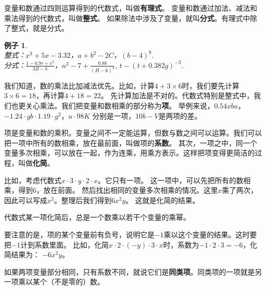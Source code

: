 \documentclass[12pt,UTF8]{ctexbook}
\newtheorem{ex}{例子}[section]
\begin{document}
变量和数通过四则运算得到的代数式，叫做\textbf{有理式}。
变量和数通过加法、减法和乘法得到的代数式，叫做\textbf{整式}。
如果除法中涉及了变量，就叫\textbf{分式}。有理式中除了整式，就是分式。
\begin{ex}\label{ex:1-1-0}
    \mbox{} \\
    \indent 整式：$x^3 + 5x - 3.32$，$a + b^2 - 2C$，$(b - 4)^9.$ \\
    \indent 分式：$\frac{1 - 0.9r + v^2}{3B - k}$，$n^2 - 7 + \frac{0.88}{(H - 6)^3}$, $t - (t + 0.382g)^{-3}.$\\
\end{ex}

我们知道，数的乘法比加减法优先。比如，计算$4 + 3\times 6$时，我们要先计算$3\times 6 = 18$，再计算$4 + 18 = 22$。
先计算加法是不对的。代数式特别是整式中，我们也更关心乘法。我们把变量和数相乘的部分称为\textbf{项}。
举例来说，$0.54xba$，$-1.24\cdot gb\cdot 1.19 \cdot g^2$，$u\cdot 98K$
分别是一项，$10b - V$是两项的差。

项是变量和数的乘积。变量之间不一定能运算，但数与数之间可以运算。我们可以把一项中所有的数相乘，放在最前面，叫做项的\textbf{系数}。
其次，一项之中，同一个变量多次相乘，可以放在一起，作为连乘，用乘方表示。这样把项变得更简洁的过程，叫做\textbf{化简}。

比如，考虑代数式$x\cdot 3\cdot y \cdot 2\cdot x $。它只有一项。
这一项中，可以先把所有的数相乘，得到$6$，放在前面。
然后找出相同的变量多次相乘的情况。这里$x$乘了两次，因此可以写成$x^2$。整理后我们得到$6x^2y$。
这就是化简的结果。

代数式某一项化简后，总是一个数乘以若干个变量的乘幂。

要注意的是，项的某个变量前有负号，说明它是$-1$乘以这个变量的结果。这时要把$-1$计到系数里面。
比如，化简$x\cdot 2 \cdot (-y)\cdot 3\cdot x$时，系数为$-1\cdot 2\cdot 3=-6$，化简结果为：
$-6x^2y$。

如果两项变量部分相同，只有系数不同，就说它们是\textbf{同类项}。同类项的一项就是另一项乘以某个（不是零的）数。
\end{document}
